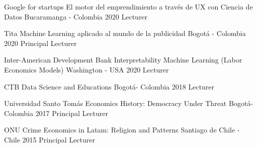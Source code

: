 
\begin{cventries}




\cventry
    {Google for startups} 
    {El motor del emprendimiento a través de UX con Ciencia de Datos} 
    {Bucaramanga - Colombia} %
    {2020} %
    {Lecturer}
    
   \cventry
   {Tita}
   {Machine Learning aplicado al mundo de la publicidad}
   {Bogotá - Colombia}
   {2020}
   {Principal Lecturer}

  \cventry
   {Inter-American Development Bank}
   {Interpretability Machine Learning (Labor Economics Models)}
   {Washington - USA}
   {2020}
   {Lecturer}

  \cventry
   {CTB}
   {Data Science and Educations}
   {Bogotá- Colombia}
   {2018}
   {Lecturer}

   \cventry
   {Universidad Santo Tomás}
   {Economics History: Democracy Under Threat}
   {Bogotá- Colombia}
   {2017}
   {Principal Lecturer}

   \cventry
   {ONU}
   {Crime Economics in Latam: Religion and Patterns}
   {Santiago de Chile - Chile}
   {2015}
   {Principal Lecturer}


\end{cventries}




